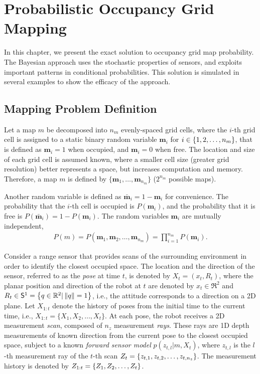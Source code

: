 
\chapter{Probabilistic Occupancy Grid Mapping} \label{chap:pogm}

In this chapter, we present the exact solution to occupancy grid map probability. The Bayesian approach uses the stochastic properties of sensors, and exploits important patterns in conditional probabilities. This solution is simulated in several examples to show the efficacy of the approach.

\section{Mapping Problem Definition}

Let a map $m$ be decomposed into $n_m$ evenly-spaced grid cells, where the $i$-th grid cell is assigned to a static binary random variable $\mathbf{m}_i$ for $i\in\left\{ 1,2,\ldots,n_m \right\}$, that is defined as $\mathbf{m}_i=1$ when occupied, and $\mathbf{m}_i=0$ when free. The location and size of each grid cell is assumed known, where a smaller cell size (greater grid resolution) better represents a space, but increases computation and memory. Therefore, a map $m$ is defined by $\{\mathbf{m}_1,\ldots, \mathbf{m}_{n_m}\}$ ($2^{n_{m}}$ possible maps).

Another random variable is defined as $\bar{\mathbf{m}}_i=1-\mathbf{m}_i$ for convenience. The probability that the $i$-th cell is occupied is $P(\mathbf{m}_i)$, and the probability that it is free is $P(\bar{\mathbf{m}}_i)=1-P(\mathbf{m}_i)$. The random variables $\mathbf{m}_i$ are mutually independent, 
\begin{align}
P(m)=P(\mathbf{m}_1,\mathbf{m}_2,\ldots,\mathbf{m}_{n_m})=\prod_{i=1}^{n_m}P(\mathbf{m}_i).
\end{align}

Consider a range sensor that provides scans of the surrounding environment in order to identify the closest occupied space. The location and the direction of the sensor, referred to as the \emph{pose} at time $t$, is denoted by $X_t=(x_t,R_t)$, where the planar position and direction of the robot at $t$ are denoted by $x_t\in\Re^2$ and $R_t\in\mathsf{S}^1=\left\{ q\in\mathbb{R}^2|\left\| q \right\|=1 \right\}$, i.e., the attitude corresponds to a direction on a 2D plane.  Let $X_{1:t}$ denote the history of poses from the initial time to the current time, i.e., $X_{1:t}=\{X_1,X_2,\ldots, X_t\}$. At each pose, the robot receives a 2D measurement \emph{scan}, composed of $n_z$ measurement \emph{rays}. These rays are 1D depth measurements of known direction from the current pose to the closest occupied space, subject to a known \emph{forward sensor model} $p(z_{t,l}|m,X_t)$, where $z_{t,l}$ is the $l$-th measurement ray of the $t$-th scan $Z_t=\left\{ z_{t,1},z_{t,2},\ldots,z_{t,n_z} \right\}$. The measurement history is denoted by $Z_{1:t}=\left\{ Z_1,Z_2,\ldots,Z_t \right\}$. 

